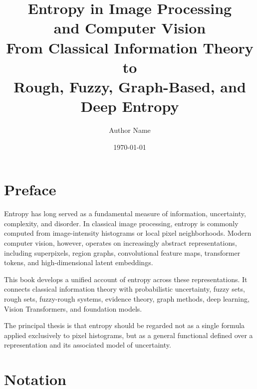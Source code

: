 \documentclass[11pt,oneside]{book}
\title{
	\Huge
	Entropy in Image Processing\\
	and Computer Vision
	\\[1em]
	\Large
	From Classical Information Theory to\\
	Rough, Fuzzy, Graph-Based, and Deep Entropy
}
\author{Author Name}
\date{\today}
\theoremstyle{remark}
\begin{document}
	
	
	\frontmatter
	
	\maketitle
	
	\chapter*{Preface}
	
	Entropy has long served as a fundamental measure of information, uncertainty,
	complexity, and disorder. In classical image processing, entropy is commonly
	computed from image-intensity histograms or local pixel neighborhoods. Modern
	computer vision, however, operates on increasingly abstract representations,
	including superpixels, region graphs, convolutional feature maps, transformer
	tokens, and high-dimensional latent embeddings.
	
	This book develops a unified account of entropy across these representations.
	It connects classical information theory with probabilistic uncertainty,
	fuzzy sets, rough sets, fuzzy-rough systems, evidence theory, graph methods,
	deep learning, Vision Transformers, and foundation models.
	
	The principal thesis is that entropy should be regarded not as a single
	formula applied exclusively to pixel histograms, but as a general functional
	defined over a representation and its associated model of uncertainty.
	
	\chapter*{Notation}
	
\end{document}
